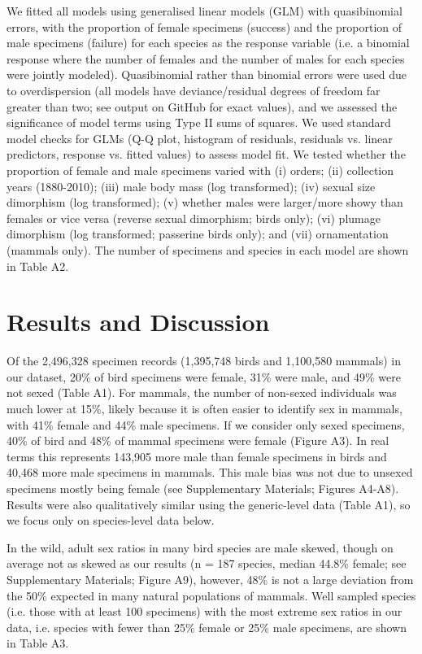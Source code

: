 \documentclass[a4paper, 12pt]{article}
\begin{document}
We fitted all models using generalised linear models (GLM) with quasibinomial errors, with the proportion of female specimens (success) and the proportion of male specimens (failure) for each species as the response variable (i.e. a binomial response where the number of females and the number of males for each species were jointly modeled). 
Quasibinomial rather than binomial errors were used due to overdispersion (all models have deviance/residual degrees of freedom far greater than two; see output on GitHub for exact values), and we assessed the significance of model terms using Type II sums of squares. 
We used standard model checks for GLMs (Q-Q plot, histogram of residuals, residuals vs. linear predictors, response vs. fitted values) to assess model fit. 
We tested whether the proportion of female and male specimens varied with (i) orders; (ii) collection years (1880-2010); (iii) male body mass (log transformed); (iv) sexual size dimorphism (log transformed); (v) whether males were larger/more showy than females or vice versa (reverse sexual dimorphism; birds only); (vi) plumage dimorphism (log transformed; passerine birds only); and (vii) ornamentation (mammals only). 
The number of specimens and species in each model are shown in Table A2.

\section{Results and Discussion}

Of the 2,496,328 specimen records (1,395,748 birds and 1,100,580 mammals) in our dataset, 20\% of bird specimens were female, 31\% were male, and 49\% were not sexed (Table A1). 
For mammals, the number of non-sexed individuals was much lower at 15\%, likely because it is often easier to identify sex in mammals, with 41\% female and 44\% male specimens. 
If we consider only sexed specimens, 40\% of bird and 48\% of mammal specimens were female (Figure A3). 
In real terms this represents 143,905 more male than female specimens in birds and 40,468 more male specimens in mammals. 
This male bias was not due to unsexed specimens mostly being female (see Supplementary Materials; Figures A4-A8).
Results were also qualitatively similar using the generic-level data (Table A1), so we focus only on species-level data below.

In the wild, adult sex ratios in many bird species are male skewed, though on average not as skewed as our results (n = 187 species, median 44.8\% female\cite{szekely2014sex}; see Supplementary Materials; Figure A9), however, 48\% is not a large deviation from the 50\% expected in many natural populations of mammals\cite{karlin1986theoretical}.
Well sampled species (i.e. those with at least 100 specimens) with the most extreme sex ratios in our data, i.e. species with fewer than 25\% female or 25\% male specimens, are shown in Table A3.
\end{document}
